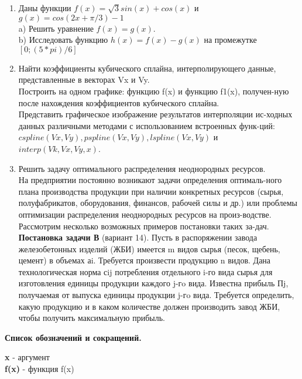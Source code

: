 \documentclass[14pt]{extreport}
\begin{document}
\begin{enumerate}
\item\footnotesize {Даны функции $f(x) = \sqrt{3}sin(x) + cos(x)$ и $g(x) = cos(2x + \pi/3) - 1$\\
a)	Решить уравнение $f(x) = g(x)$.\\
b)	Исследовать функцию $h(x) = f(x) - g(x)$ на промежутке $[0 ; (5*pi)/6]$}\\
\item Найти коэффициенты кубического сплайна, интерполирующего данные, представленные в векторах Vx и Vy. \\
Построить на одном графике: функцию f(x) и функцию f1(x), получен-ную после нахождения коэффициентов кубического сплайна.\\
Представить графическое изображение результатов интерполяции ис-ходных данных различными методами с использованием встроенных функ-ций:\\
$cspline(Vx,Vy), pspline(Vx,Vy), lspline(Vx,Vy)$ и $interp(Vk,Vx,Vy,x)$.

\item Решить задачу оптимального распределения неоднородных ресурсов.\\
На предприятии постоянно возникают задачи определения оптималь-ного плана производства продукции при наличии конкретных ресурсов (сырья, полуфабрикатов, оборудования, финансов, рабочей силы и др.) или проблемы оптимизации распределения неоднородных ресурсов на произ-водстве. Рассмотрим несколько возможных примеров постановки таких за-дач.\\
\textbf{Постановка задачи В} (вариант 14). Пусть в распоряжении завода железобетонных изделий (ЖБИ) имеется m видов сырья (песок, щебень, цемент) в объемах аi. Требуется произвести продукцию n видов. Дана технологическая норма сij потребления отдельного i-го вида сырья для изготовления единицы продукции каждого j-гo вида. Известна прибыль Пj, получаемая от выпуска единицы продукции j-гo вида. Требуется определить, какую продукцию и в каком количестве должен производить завод ЖБИ, чтобы получить максимальную прибыль.
\end{enumerate}

\newpage

\textbf{Список обозначений и сокращений.\\[0.4cm]}

\textbf{x} - аргумент\\[0.4cm]

\textbf{f(x)} - функция f(x)\\[0.4cm]
\end{document}

